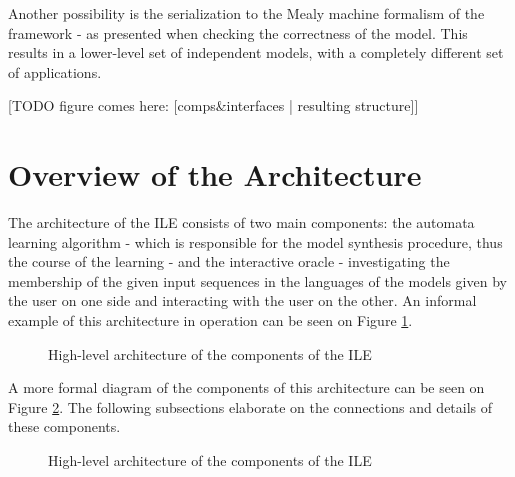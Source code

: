 Another possibility is the serialization to the Mealy machine formalism of the framework - as presented when checking the correctness of the model. This results in a lower-level set of independent models, with a completely different set of applications.

[TODO figure comes here: [comps\&interfaces | resulting structure]]
\clearpage
\section{Overview of the Architecture} \label{sec_architecture}

The architecture of the ILE consists of two main components: the automata learning algorithm - which is responsible for the model synthesis procedure, thus the course of the learning - and the interactive oracle - investigating the membership of the given input sequences in the languages of the models given by the user on one side and interacting with the user on the other. An informal example of this architecture in operation can be seen on Figure \ref{fig_architcture_informaloverview}. 

\begin{figure}[!ht] 
	\centering
	\caption{High-level architecture of the components of the ILE} 
	\label{fig_architcture_informaloverview}
\end{figure}

A more formal diagram of the components of this architecture can be seen on Figure \ref{fig_architcture_ileoverview}. The following subsections elaborate on the connections and details of these components.

\begin{figure}[!ht] 
	\centering
	\caption{High-level architecture of the components of the ILE} 
	\label{fig_architcture_ileoverview}
\end{figure}

